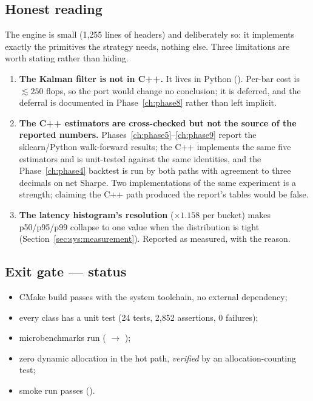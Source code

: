 \subsection{Honest reading}

The engine is small (1{,}255 lines of headers) and deliberately so: it implements exactly
the primitives the strategy needs, nothing else. Three limitations are worth stating
rather than hiding.
\begin{enumerate}
  \item \textbf{The Kalman filter is not in C++.} It lives in Python
    (). Per-bar cost is $\lesssim250$ flops, so the port
    would change no conclusion; it is deferred, and the deferral is documented in
    Phase~\ref{ch:phase8} rather than left implicit.
  \item \textbf{The C++ estimators are cross-checked but not the source of the reported
    numbers.} Phases~\ref{ch:phase5}--\ref{ch:phase9} report the sklearn/Python walk-forward
    results; the C++  implements the same five estimators and is
    unit-tested against the same identities, and the Phase~\ref{ch:phase4} backtest is run
    by both paths with agreement to three decimals on net Sharpe. Two implementations of
    the same experiment is a strength; claiming the C++ path produced the report's tables
    would be false.
  \item \textbf{The latency histogram's resolution} ($\times1.158$ per bucket) makes
    p50/p95/p99 collapse to one value when the distribution is tight
    (Section~\ref{sec:sys:measurement}). Reported as measured, with the reason.
\end{enumerate}

\subsection{Exit gate --- status}

\begin{itemize}
  \item[\checkmark] CMake build passes with the system toolchain, no external dependency;
  \item[\checkmark] every class has a unit test (24 tests, 2{,}852 assertions, 0 failures);
  \item[\checkmark] microbenchmarks run ( $\to$
    );
  \item[\checkmark] zero dynamic allocation in the hot path, \emph{verified} by an
    allocation-counting test;
  \item[\checkmark]  smoke run passes ().
\end{itemize}
